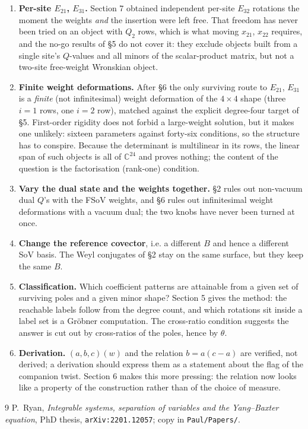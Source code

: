 \documentclass[11pt]{article}
\begin{document}
\begin{enumerate}
\item \textbf{Per-site $E_{21}$, $E_{31}$.} Section 7 obtained independent per-site $E_{32}$ rotations
the moment the weights \emph{and} the insertion were left free. That freedom has never been tried on
an object with $Q_2$ rows, which is what moving $x_{21}$, $x_{22}$ requires, and the no-go results of
\S5 do not cover it: they exclude objects built from a single site's $Q$-values and all minors of the
scalar-product matrix, but not a two-site free-weight Wronskian object.
\item \textbf{Finite weight deformations.} After \S6 the only surviving route to $E_{21}$, $E_{31}$ is
a \emph{finite} (not infinitesimal) weight deformation of the $4\times4$ shape (three $i=1$ rows, one
$i=2$ row), matched against the explicit degree-four target of \S5. First-order rigidity does not
forbid a large-weight solution, but it makes one unlikely: sixteen parameters against forty-six
conditions, so the structure has to conspire. Because the determinant is multilinear in its rows, the
linear span of such objects is all of $\mathbb{C}^{24}$ and proves nothing; the content of the
question is the factorisation (rank-one) condition.
\item \textbf{Vary the dual state and the weights together.} \S2 rules out non-vacuum dual $Q$'s with
the FSoV weights, and \S6 rules out infinitesimal weight deformations with a vacuum dual; the two
knobs have never been turned at once.
\item \textbf{Change the reference covector}, i.e. a different $B$ and hence a different SoV basis.
The Weyl conjugates of \S2 stay on the same surface, but they keep the same $B$.
\item \textbf{Classification.} Which coefficient patterns are attainable from a given set of
surviving poles and a given minor shape? Section 5 gives the method: the reachable labels follow
from the degree count, and which rotations sit inside a label set is a Gr\"obner computation. The cross-ratio condition suggests the answer is cut out
by cross-ratios of the poles, hence by $\theta$.
\item \textbf{Derivation.} $(a,b,c)(w)$ and the relation $b=a(c-a)$ are verified, not derived; a
derivation should express them as a statement about the flag of the companion twist. Section 6 makes
this more pressing: the relation now looks like a property of the construction rather than of the
choice of measure.
\end{enumerate}

\begin{thebibliography}{9}
 P.~Ryan, \emph{Integrable systems, separation of variables and the Yang--Baxter
equation}, PhD thesis, \texttt{arXiv:2201.12057}; copy in \texttt{Paul/Papers/}.
\end{thebibliography}
\end{document}

